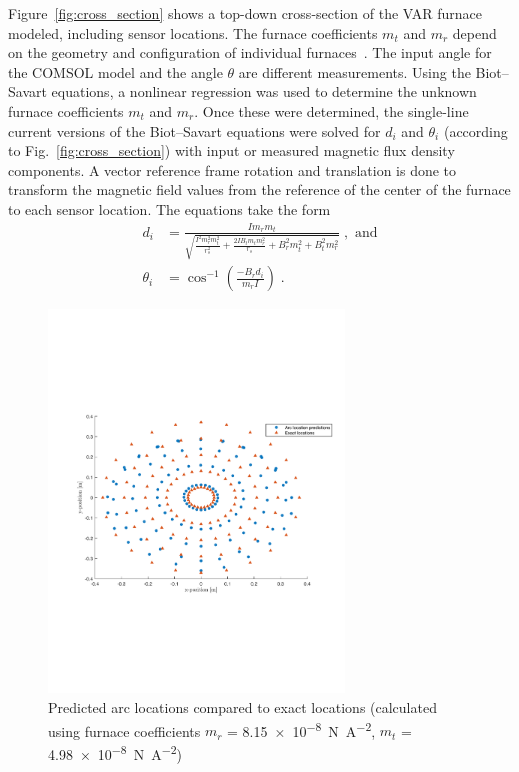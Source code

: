 \documentclass[onehalf,11pt]{beavtex}
\begin{document}
Figure~\ref{fig:cross_section} shows a top-down cross-section of the VAR furnace modeled, including sensor locations.
The furnace coefficients $m_t$ and $m_r$ depend on the geometry and configuration of individual furnaces~\cite{Woodside:2013cf}.
The input angle for the COMSOL model and the angle $\theta$ are different measurements. 
Using the Biot--Savart equations, a nonlinear regression was used to determine the unknown furnace coefficients $m_t$ and $m_r$.
Once these were determined, the single-line current versions of the Biot--Savart equations were solved for $d_i$ and $\theta_i$ (according to Fig.~\ref{fig:cross_section}) with input or measured magnetic flux density components.
A vector reference frame rotation and translation is done to transform the magnetic field values from the reference of the center of the furnace to each sensor location.
The equations take the form
\begin{align}
d_i &= \frac{I m_r m_t}{\sqrt{{\frac{I^2 m^2_r m^2_t}{r^2_s}}+\frac{2 I B_t m_t m^2_r}{r_s} + B^2_r m^2_t + B^2_t m^2_r}} \;, \text{ and} \label{eq:arc_diameter} \\
\theta_i &= \cos^{-1} \left( \frac{-B_r d_i}{m_r I} \right) \;. \label{eq:arc_angle}
\end{align}

\begin{figure}[htbp]
	\centering
	\includegraphics[width=0.7\textwidth]{OneSensorExpected2.pdf}
	\caption{Predicted arc locations compared to exact locations (calculated using furnace coefficients $m_r$ = \SI{8.15e-8}{\newton\per\ampere\squared}, $m_t$ = \SI{4.98e-8}{\newton\per\ampere\squared})}
	\label{fig:exactpos}
\end{figure}
\end{document}
